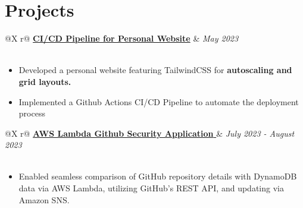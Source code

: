 \documentclass[a4paper,12pt]{article}
\begin{document}
\section{Projects}

\begin{tabularx}{\linewidth}{ @{}X r@{} }
    \href{https://ishan-next-react-website.vercel.app/}{\textbf{CI/CD Pipeline for Personal Website}} & \textit{May 2023} \\
     \\
\end{tabularx} 


\begin{minipage}{\linewidth}
    \begin{itemize}[nosep,after=\strut, leftmargin=1em]
    \item Developed a personal website featuring TailwindCSS for \textbf{autoscaling and grid layouts. }

    \item Implemented a Github Actions CI/CD Pipeline to automate the deployment process
    \end{itemize}
\end{minipage}




    

\begin{tabularx}{\linewidth}{ @{}X r@{} }
    \href{https://github.com/IshanPhadte776/LambdaEventTriggering}{\textbf{AWS Lambda Github Security Application }} & \textit{July 2023 - August 2023} \\
     \\
\end{tabularx}





\begin{minipage}{\linewidth}
\begin{itemize}[nosep,after=\strut, leftmargin=1em]
        \item Enabled seamless comparison of GitHub repository details with DynamoDB data via AWS Lambda, utilizing GitHub's REST API, and updating via Amazon SNS.
    \end{itemize}
\end{minipage}
\end{document}
